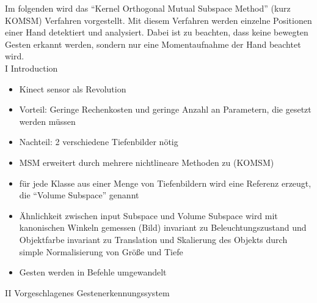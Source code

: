 Im folgenden wird das ``Kernel Orthogonal Mutual Subspace Method'' (kurz KOMSM) Verfahren vorgestellt. Mit diesem Verfahren werden einzelne Positionen einer Hand detektiert und analysiert. Dabei ist zu beachten, dass keine bewegten Gesten erkannt werden, sondern nur eine Momentaufnahme der Hand beachtet wird. \\


I Introduction
\begin{itemize}
\item Kinect sensor als Revolution
\item Vorteil: Geringe Rechenkosten und geringe Anzahl an Parametern, die gesetzt werden müssen
\item Nachteil: 2 verschiedene Tiefenbilder n\"otig
\item MSM erweitert durch mehrere nichtlineare Methoden zu (KOMSM)
\item für jede Klasse aus einer Menge von Tiefenbildern wird eine Referenz erzeugt, die ``Volume Subspace'' genannt
\item Ähnlichkeit zwischen input Subspace und Volume Subspace wird mit kanonischen Winkeln gemessen (Bild)
\subitem invariant zu Beleuchtungszustand und Objektfarbe
\subitem invariant zu Translation und Skalierung des Objekts durch simple Normalisierung von Gr\"oße und Tiefe
\item Gesten werden in Befehle umgewandelt
\end{itemize}
II Vorgeschlagenes Gestenerkennungssystem
